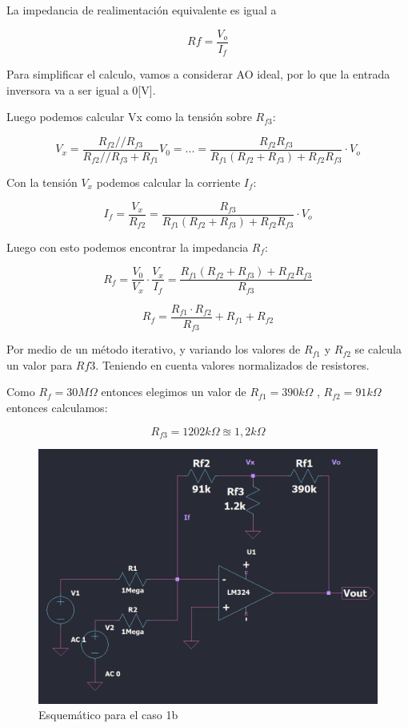 La impedancia de realimentación equivalente es igual a 

\[Rf = \frac{V_o}{I_f}\]

Para simplificar el calculo, vamos a considerar AO ideal, por lo que la entrada inversora va a ser igual a 0[V].

Luego podemos calcular Vx como la tensión sobre $R_{f3}$:

\[ V_x = \frac{  R_{f2} //  R_{f3} }{ R_{f2} //  R_{f3} + R_{f1} } V_0  = ... = \frac{R_{f2} R_{f3}}{R_{f1} (R_{f2} + R_{f3}) + R_{f2} R_{f3}} \cdot V_o
\]

Con la tensión $V_x$ podemos calcular la corriente $I_f$:

\[ I_f = \frac{V_x}{R_{f2}} = \frac{R_{f3}}{R_{f1} (R_{f2} + R_{f3}) + R_{f2} R_{f3}} \cdot V_o\]


Luego con esto podemos encontrar la impedancia $R_f$:

\[R_f = \frac{V_0}{V_x} \cdot \frac{V_x}{I_f} = \frac{R_{f1} (R_{f2} + R_{f3}) + R_{f2} R_{f3}}{R_{f3}} \]

\[R_f = \frac{R_{f1} \cdot R_{f2} }{R_{f3} } +R_{f1}  + R_{f2}  \]

Por medio de un método iterativo, y variando los valores de $R_{f1}$ y $R_{f2}$ se calcula un valor para $R{f3}$. Teniendo en cuenta valores normalizados de resistores.

\vspace{1em}

Como $R_f = 30M\Omega$ entonces elegimos un valor de $R_{f1} = 390k \Omega$ , $R_{f2} = 91k \Omega$ entonces calculamos:

\vspace{1em}
\[R_{f3} = 1202k\Omega \approxeq 1,2k \Omega \]


\begin{figure}[h!]
    \centering
    \includegraphics[width=0.90\linewidth]{img/caso1b.png}
    \caption{Esquemático para el caso 1b}
    \label{fig:caso1b}
\end{figure}


